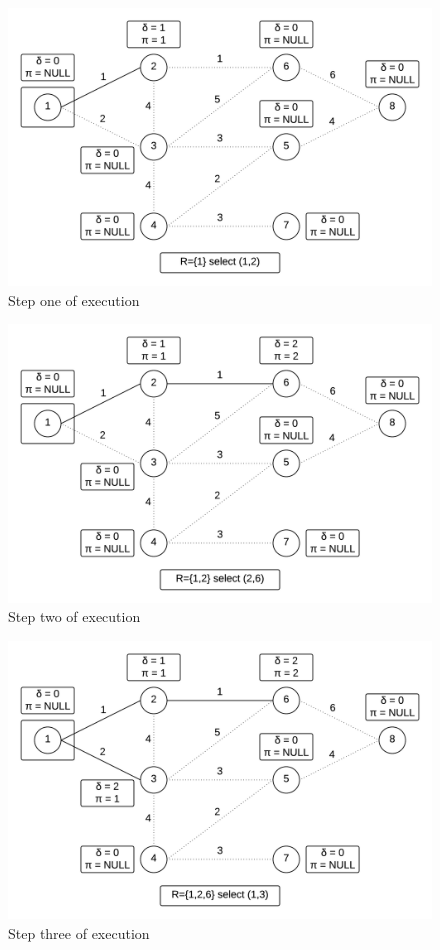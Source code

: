 \documentclass[12pt,letterpaper]{article}
\begin{document}
\begin{figure}
\centering
\includegraphics[width=12cm]{d1}
\caption{Step one of execution}
\end{figure}

\begin{figure}
\centering
\includegraphics[width=12cm]{d2}
\caption{Step two of execution}
\end{figure}

\begin{figure}
\centering
\includegraphics[width=12cm]{d3}
\caption{Step three of execution}
\end{figure}
\end{document}
